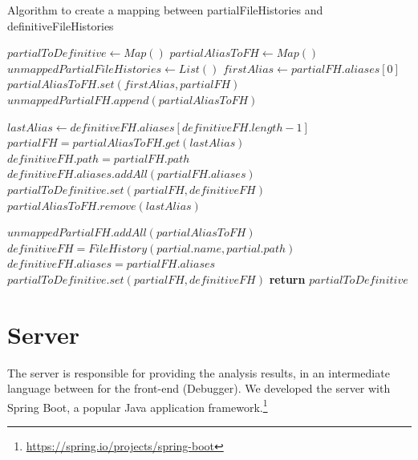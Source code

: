 \begin{algorithm}
    \caption{Algorithm to create a mapping between partialFileHistories and definitiveFileHistories}
    \begin{algorithmic}[1]
        \State $partialToDefinitive \gets Map()$
        \State $partialAliasToFH \gets Map()$ 
        \State $unmappedPartialFileHistories \gets List()$  
            \State $firstAlias \gets partialFH.aliases[0]$
                \State $partialAliasToFH.set(firstAlias, partialFH)$  
            \Else
                \State $unmappedPartialFH.append(partialAliasToFH)$  
            \EndIf
        \EndFor

         
            \State $lastAlias \gets definitiveFH.aliases[definitiveFH.length - 1]$
                \State $partialFH = partialAliasToFH.get(lastAlias)$
                \State $definitiveFH.path = partialFH.path$
                \State $definitiveFH.aliases.addAll(partialFH.aliases)$
                \State $partialToDefinitive.set(partialFH, definitiveFH)$
                \State $partialAliasToFH.remove(lastAlias)$
            \EndIf
        \EndFor

        \State $unmappedPartialFH.addAll(partialAliasToFH)$ 
            \State $definitiveFH = FileHistory(partial.name, partial.path)$
            \State $definitiveFH.aliases = partialFH.aliases $
            \State $partialToDefinitive.set(partialFH, definitiveFH)$
        \EndFor
        \State \textbf{return} $partialToDefinitive$
    \EndProcedure
    \end{algorithmic}
\end{algorithm}


\section{Server}
The server is responsible for providing the analysis results, in an intermediate language between for the 
front-end (Debugger). We developed the server with Spring Boot, a popular Java application framework.\footnote{\url{https://spring.io/projects/spring-boot}}


